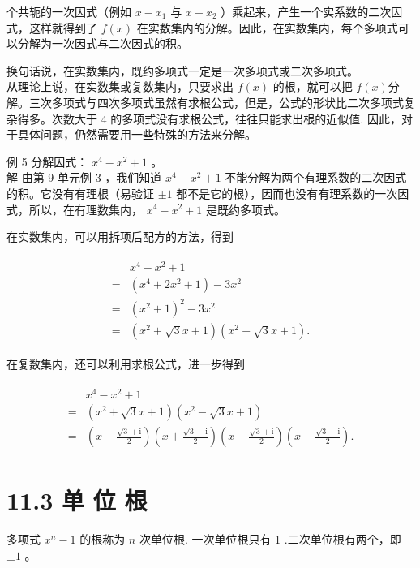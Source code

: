 \documentclass[10pt]{article}
\begin{document}
个共轭的一次因式（例如 $x-x_{1}$ 与 $x-x_{2}$ ）乘起来，产生一个实系数的二次因式，这样就得到了 $f(x)$ 在实数集内的分解。因此，在实数集内，每个多项式可以分解为一次因式与二次因式的积。

换句话说，在实数集内，既约多项式一定是一次多项式或二次多项式。\\
从理论上说，在实数集或复数集内，只要求出 $f(x)$ 的根，就可以把 $f(x)$分解。三次多项式与四次多项式虽然有求根公式，但是，公式的形状比二次多项式复杂得多。次数大于 4 的多项式没有求根公式，往往只能求出根的近似值. 因此，对于具体问题，仍然需要用一些特殊的方法来分解。

例 5 分解因式： $x^{4}-x^{2}+1$ 。\\
解 由第 9 单元例 3 ，我们知道 $x^{4}-x^{2}+1$ 不能分解为两个有理系数的二次因式的积。它没有有理根（易验证 $\pm 1$ 都不是它的根），因而也没有有理系数的一次因式，所以，在有理数集内， $x^{4}-x^{2}+1$ 是既约多项式。

在实数集内，可以用拆项后配方的方法，得到

\begin{align*}
\begin{aligned}
& x^{4}-x^{2}+1 \\
= & \left(x^{4}+2 x^{2}+1\right)-3 x^{2} \\
= & \left(x^{2}+1\right)^{2}-3 x^{2} \\
= & \left(x^{2}+\sqrt{3} x+1\right)\left(x^{2}-\sqrt{3} x+1\right) .
\end{aligned}
\end{align*}

在复数集内，还可以利用求根公式，进一步得到

\begin{align*}
\begin{aligned}
& x^{4}-x^{2}+1 \\
= & \left(x^{2}+\sqrt{3} x+1\right)\left(x^{2}-\sqrt{3} x+1\right) \\
= & \left(x+\frac{\sqrt{3}+\mathrm{i}}{2}\right)\left(x+\frac{\sqrt{3}-\mathrm{i}}{2}\right)\left(x-\frac{\sqrt{3}+\mathrm{i}}{2}\right)\left(x-\frac{\sqrt{3}-\mathrm{i}}{2}\right) .
\end{aligned}
\end{align*}

\section*{11.3 单 位 根}
多项式 $x^{n}-1$ 的根称为 $n$ 次单位根. 一次单位根只有 1 .二次单位根有两个，即 $\pm 1$ 。
\end{document}
